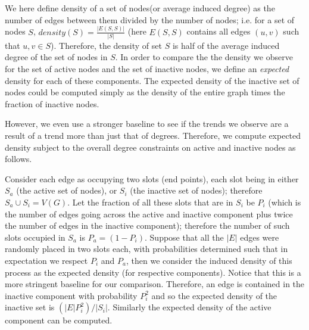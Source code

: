 \documentclass[phd,tocprelim]{cornell}
\begin{document}
We here define density of a set of nodes(or average induced degree) as the number of edges between them divided by the number of nodes; i.e. for a set of nodes $S$, $density(S) = \frac{|E(S, S)|}{|S|}$ (here $E(S, S)$ contains all edges $(u, v)$ such that $u, v\in S$). Therefore, the density of set $S$ is half of the average induced degree of the set of nodes in $S$. In order to compare the the density we observe for the set of active nodes and the set of inactive nodes, we define an {\em expected} density for each of these components. The expected density of the inactive set of nodes could be computed simply as the density of the entire graph times the fraction of inactive nodes. 

However, we even use a stronger baseline to see if the trends we observe are a result of a trend more than just that of degrees. Therefore, we compute expected density subject to the overall degree constraints on active and inactive nodes as follows. 

Consider each edge as occupying two slots (end points), each slot being in either $S_a$ (the active set of nodes), or $S_i$ (the inactive set of nodes); therefore $S_a\cup S_i = V(G)$. Let the fraction of all these slots that are in $S_i$ be $P_i$ (which is the number of edges going across the active and inactive component plus twice the number of edges in the inactive component); therefore the number of such slots occupied in $S_a$ is $P_a = (1-P_i)$. Suppose that all the $|E|$ edges were randomly placed in two slots each, with probabilities determined such that in expectation we respect $P_i$ and $P_a$, then we consider the induced density of this process as the expected density (for respective components). Notice that this is a more stringent baseline for our comparison. Therefore, an edge is contained in the inactive component with probability $P_i^2$ and so the expected density of the inactive set is $(|E|P_i^2)/|S_i|$. Similarly the expected density of the active component can be computed. 
\end{document}
